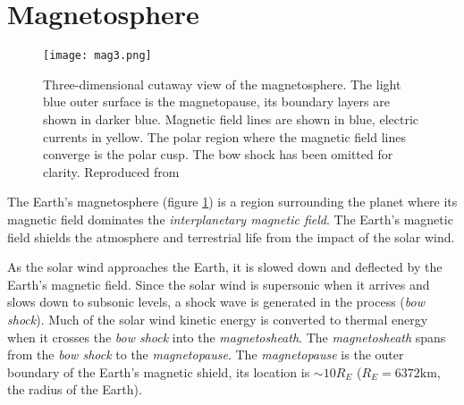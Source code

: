 \section{Magnetosphere}\label{sec:mag}


\begin{figure}
    \noindent\texttt{[image: mag3.png]}
    \caption{\small{Three-dimensional cutaway view of the magnetosphere. The light blue outer surface is the magnetopause, 
    its boundary layers are shown in darker blue. Magnetic field lines are shown in blue, electric currents in yellow. 
    The polar region where the magnetic field lines converge is the polar cusp. The bow shock has been omitted for clarity. 
    Reproduced from \citet{DeKeyser2005}}
    }
    \label{fig:magnetosphere}
\end{figure}

The Earth's magnetosphere (figure \ref{fig:magnetosphere}) is a region surrounding the planet where its magnetic field 
dominates the \emph{interplanetary magnetic field}. The Earth's magnetic field shields the atmosphere and terrestrial life 
from the impact of the solar wind. 

As the solar wind approaches the Earth, it is slowed down and deflected by the Earth's magnetic field. Since the 
solar wind is supersonic when it arrives and slows down to subsonic levels, a shock wave is generated in the 
process (\emph{bow shock}). Much of the solar wind kinetic energy is converted to thermal energy when it crosses 
the \emph{bow shock} into the \emph{magnetosheath}. The \emph{magnetosheath} spans from the \emph{bow shock} to 
the \emph{magnetopause}. The \emph{magnetopause} is the outer boundary of the Earth's magnetic shield, its location 
is $\sim 10R_E$ ($R_E = 6372 \text{km}$, the radius of the Earth). 


